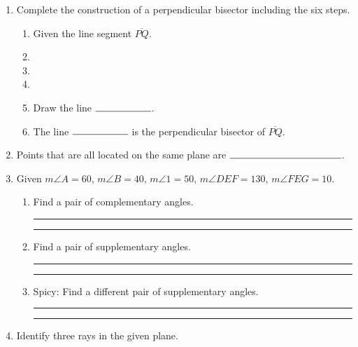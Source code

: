 \documentclass[12pt, oneside]{article}
\begin{document}
\begin{enumerate}
  \item Complete the construction of a perpendicular bisector including the six steps.
    \begin{enumerate}
      \item Given the line segment $\overline{PQ}$.
      \bigskip
      \item %
      \bigskip
      \item %
      \bigskip
      \item %
      \bigskip
      \item Draw the line $\rule{2cm}{0.15mm}$.
      \bigskip
      \item The line $\rule{2cm}{0.15mm}$ is the perpendicular bisector of $\overline{PQ}$.
    \end{enumerate}
    \vspace{7cm}
    \begin{center}
    \end{center}
\newpage
  \item Points that are all located on the same plane are $\rule{4cm}{0.15mm}$. \bigskip

  \item Given $m \angle A=60$, $m \angle B=40$, $m \angle 1=50$, $m \angle DEF=130$, $m \angle FEG=10$. \bigskip
    \begin{enumerate}
      \item Find a pair of complementary angles. \rule{3cm}{0.15mm} \hspace{1cm} \rule{3cm}{0.15mm} \bigskip
      \item Find a pair of supplementary angles. \rule{3cm}{0.15mm} \hspace{1cm} \rule{3cm}{0.15mm} \bigskip
      \item Spicy: Find a different pair of supplementary angles. \rule{2cm}{0.15mm} \hspace{0.5cm} \rule{2cm}{0.15mm}
    \end{enumerate}

\item Identify three rays in the given plane.\\[0.25in]
  \vspace{1cm}



\end{enumerate}
\end{document}
